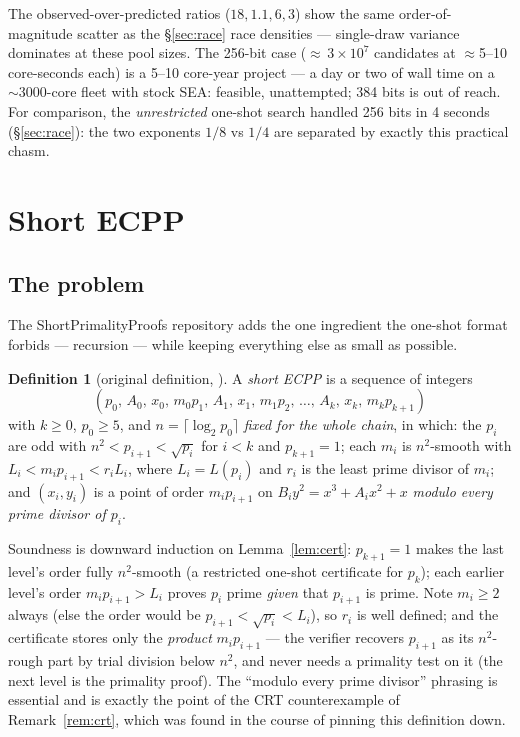 \documentclass[11pt]{amsart}
\theoremstyle{plain}
\theoremstyle{definition}
\newtheorem{definition}[theorem]{Definition}
\theoremstyle{remark}
\begin{document}
\medskip
\noindent The observed-over-predicted ratios ($18, 1.1, 6, 3$) show the same order-of-magnitude scatter as the
\S\ref{sec:race} race densities --- single-draw variance dominates at these pool sizes.  The 256-bit
case (${\approx}\,3\times 10^7$ candidates at ${\approx}$5--10 core-seconds each) is a 5--10 core-year
project --- a day or two of wall time on a ${\sim}3000$-core fleet with stock SEA: feasible,
unattempted; 384 bits is out of reach.  For comparison, the \emph{unrestricted} one-shot search handled 256 bits in 4 seconds
(\S\ref{sec:race}): the two exponents $1/8$ vs $1/4$ are separated by exactly this practical chasm.

\section{Short ECPP}\label{sec:short}

\subsection{The problem}\label{sec:shortdef}

The ShortPrimalityProofs repository \cite{Short} adds the one ingredient the one-shot format forbids ---
recursion --- while keeping everything else as small as possible.

\begin{definition}[{original definition, \cite{Short}}]\label{def:short}
A \emph{short ECPP} is a sequence of integers
\[
  (p_0,\, A_0,\, x_0,\, m_0p_1,\, A_1,\, x_1,\, m_1p_2,\, \dots,\, A_k,\, x_k,\, m_kp_{k+1})
\]
with $k \ge 0$,
$p_0 \ge 5$, and $n = \lceil\log_2 p_0\rceil$ \emph{fixed for the whole chain}, in which: the $p_i$ are
odd with $n^2 < p_{i+1} < \sqrt{p_i}$ for $i < k$ and $p_{k+1} = 1$; each $m_i$ is $n^2$-smooth with
$L_i < m_ip_{i+1} < r_iL_i$, where $L_i = L(p_i)$ and $r_i$ is the least prime divisor of $m_i$; and
$(x_i, y_i)$ is a point of order $m_ip_{i+1}$ on $B_iy^2 = x^3+A_ix^2+x$ \emph{modulo every prime
divisor of $p_i$}.
\end{definition}

Soundness is downward induction on Lemma~\ref{lem:cert}: $p_{k+1} = 1$ makes the last level's order
fully $n^2$-smooth (a restricted one-shot certificate for $p_k$); each earlier level's order
$m_ip_{i+1} > L_i$ proves $p_i$ prime \emph{given} that $p_{i+1}$ is prime.  Note $m_i \ge 2$ always
(else the order would be $p_{i+1} < \sqrt{p_i} < L_i$), so $r_i$ is well defined; and the certificate
stores only the \emph{product} $m_ip_{i+1}$ --- the verifier recovers $p_{i+1}$ as its $n^2$-rough part
by trial division below $n^2$, and never needs a primality test on it (the next level is the primality
proof).  The ``modulo every prime divisor'' phrasing is essential and is exactly the point of the CRT
counterexample of Remark~\ref{rem:crt}, which was found in the course of pinning this definition down.
\end{document}
